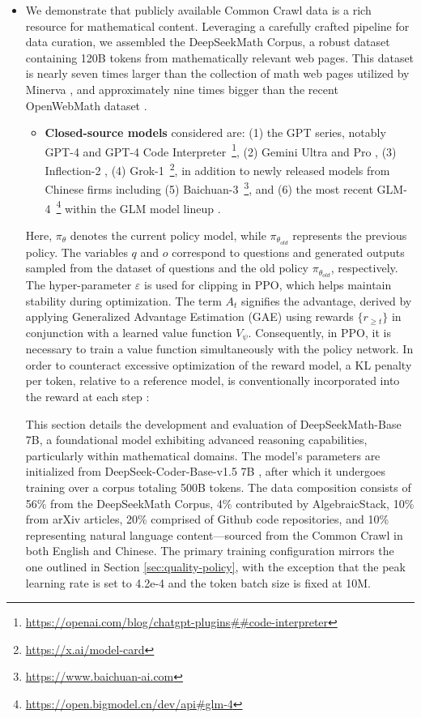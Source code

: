\begin{itemize}[topsep=0pt]
    \item We demonstrate that publicly available Common Crawl data is a rich resource for mathematical content. Leveraging a carefully crafted pipeline for data curation, we assembled the DeepSeekMath Corpus, a robust dataset containing 120B tokens from mathematically relevant web pages. This dataset is nearly seven times larger than the collection of math web pages utilized by Minerva \citep{minerva}, and approximately nine times bigger than the recent OpenWebMath dataset \citep{openwebmath}.

\begin{itemize}[topsep=0pt]
    \item \textbf{Closed-source models} considered are: (1) the GPT series, notably GPT-4 \citep{gpt4} and GPT-4 Code Interpreter~\footnote{\url{https://openai.com/blog/chatgpt-plugins\#\#code-interpreter}}, (2) Gemini Ultra and Pro \citep{gemini}, (3) Inflection-2 \citep{inflection-2}, (4) Grok-1~\footnote{\url{https://x.ai/model-card}}, in addition to newly released models from Chinese firms including (5) Baichuan-3~\footnote{\url{https://www.baichuan-ai.com}}, and (6) the most recent GLM-4~\footnote{\url{https://open.bigmodel.cn/dev/api\#glm-4}} within the GLM model lineup \citep{glm}.
\end{itemize}

Here, $\pi_{\theta}$ denotes the current policy model, while $\pi_{\theta_{old}}$ represents the previous policy. The variables $q$ and $o$ correspond to questions and generated outputs sampled from the dataset of questions and the old policy $\pi_{\theta_{old}}$, respectively. The hyper-parameter $\varepsilon$ is used for clipping in PPO, which helps maintain stability during optimization. The term $A_t$ signifies the advantage, derived by applying Generalized Advantage Estimation (GAE) \citep{gae} using rewards $\{r_{\ge t}\}$ in conjunction with a learned value function $V_{\psi}$. Consequently, in PPO, it is necessary to train a value function simultaneously with the policy network. In order to counteract excessive optimization of the reward model, a KL penalty per token, relative to a reference model, is conventionally incorporated into the reward at each step \citep{ouyang2022training}:

This section details the development and evaluation of DeepSeekMath-Base 7B, a foundational model exhibiting advanced reasoning capabilities, particularly within mathematical domains. The model's parameters are initialized from DeepSeek-Coder-Base-v1.5 7B \citep{deepseek-coder}, after which it undergoes training over a corpus totaling 500B tokens. The data composition consists of 56\% from the DeepSeekMath Corpus, 4\% contributed by AlgebraicStack, 10\% from arXiv articles, 20\% comprised of Github code repositories, and 10\% representing natural language content—sourced from the Common Crawl in both English and Chinese. The primary training configuration mirrors the one outlined in Section \ref{sec:quality-policy}, with the exception that the peak learning rate is set to 4.2e-4 and the token batch size is fixed at 10M.


\end{itemize}
